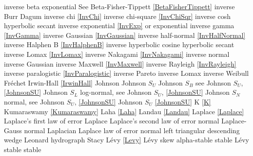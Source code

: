 inverse beta exponential 		\dotfill	See Beta-Fisher-Tippett \eqref{BetaFisherTippett}\ncite
inverse Burr					\dotfill	Dagum 								\ncite	%
inverse chi  					\dotfill	\eqref{InvChi}						\ncite	%
inverse chi-square 				\dotfill	\eqref{InvChiSqr}					\ncite	%
inverse cosh					\dotfill	hyperbolic secant					\ncite
inverse exponential 			\dotfill	\eqref{InvExp} or exponential		\ncite	%
inverse gamma 					\dotfill	\eqref{InvGamma}					\ncite	%
inverse Gaussian				\dotfill	\eqref{InvGaussian}					\ncite	%
inverse half-normal				\dotfill	\eqref{InvHalfNormal}				\ncite
inverse Halphen B				\dotfill	\eqref{InvHalphenB}					\ncite	
inverse hyperbolic cosine		\dotfill	hyperbolic secant 					\ncite	%
inverse Lomax					\dotfill	\eqref{InvLomax}					\ncite	%
inverse Nakagami				\dotfill	\eqref{InvNakagami}					
inverse normal					\dotfill	inverse Gaussian					\ncite	%
inverse Maxwell					\dotfill	\eqref{InvMaxwell}					
inverse Rayleigh  				\dotfill	\eqref{InvRayleigh}					\ncite	%
inverse paralogistic			\dotfill	\eqref{InvParalogistic} 			\ncite	%
inverse Pareto					\dotfill	inverse Lomax 						\ncite 	%
inverse Weibull 				\dotfill	Fr\'{e}chet  						\ncite	%
Irwin-Hall						\dotfill	\eqref{IrwinHall}					\ncite
%
Johnson							\dotfill	Johnson $S_U$						\ncite
Johnson $S_B$					\dotfill	see Johnson $S_U$, \eqref{JohnsonSU} \ncite
Johnson $S_L$					\dotfill	log-normal, see Johnson $S_U$, \eqref{JohnsonSU}		\ncite
Johnson $S_N$					\dotfill	normal, see Johnson $S_U$, \eqref{JohnsonSU}			\ncite
Johnson $S_U$					\dotfill	\eqref{JohnsonSU}					\ncite
%
K								\dotfill	\eqref{K}							\ncite	%
Kumaraswamy						\dotfill	\eqref{Kumaraswamy} 				\ncite	%
%
Laha							\dotfill	\eqref{Laha}						\ncite
Landau							\dotfill	\eqref{Landau}						\ncite
Laplace							\dotfill	\eqref{Laplace} 					\ncite	%
Laplace's first law of error	\dotfill	Laplace 							\ncite	%
Laplace's second law of error  	\dotfill	normal 								\ncite	%
Laplace-Gauss					\dotfill	normal 								\ncite	%
Laplacian  						\dotfill	Laplace								\ncite 	%
law of error					\dotfill	normal 								\ncite	%
left triangular					\dotfill	descending wedge					\ncite	%
Leonard hydrograph				\dotfill	Stacy 								\ncite	%
L\'{e}vy 						\dotfill	\eqref{Levy}						\ncite	%
L\'evy skew alpha-stable		\dotfill	stable								\ncite
L\'{e}vy stable					\dotfill	stable								\ncite

